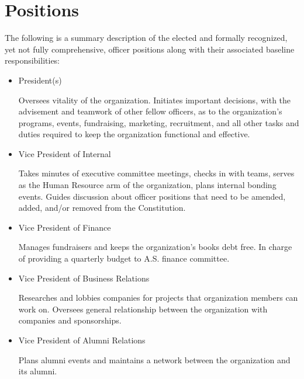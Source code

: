 \documentclass[12pt]{constitution}
\begin{document}
\section{Positions} {

The following is a summary description of the elected and formally recognized, yet not fully comprehensive, officer positions along with their associated baseline responsibilities:

	\begin{itemize}
  		\item President(s)  {
        
       \par\indent
        	Oversees vitality of the organization. Initiates important decisions, with the advisement and teamwork of other fellow officers, as to the organization's programs, events, fundraising, marketing, recruitment, and all other tasks and duties required to keep the organization functional and effective.
        }
        \item Vice President of Internal {
        
        \par\indent
        	Takes minutes of executive committee meetings, checks in with teams, serves as the Human Resource arm of the organization, plans internal bonding events. Guides discussion about officer positions that need to be amended, added, and/or removed from the Constitution.
        }
  		\item Vice President of Finance {
        
        \par\indent
        	Manages fundraisers and keeps the organization's books debt free. In charge of providing a quarterly budget to A.S. finance committee.
        }
  		\item Vice President of Business Relations {
        
        \par\indent
        	Researches and lobbies companies for projects that organization members can work on. Oversees general relationship between the organization with companies and sponsorships.
        }
        
  		\item Vice President of Alumni Relations {
        
        \par\indent
        	Plans alumni events and maintains a network between the organization and its alumni.
        }
        

\end{itemize}}
\end{document}
